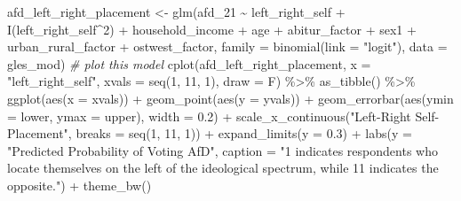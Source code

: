 \documentclass[
]{article}
\newenvironment{Shaded}{\begin{snugshade}}{\end{snugshade}}
\newcommand{\AttributeTok}[1]{\textcolor[rgb]{0.77,0.63,0.00}{#1}}
\newcommand{\CommentTok}[1]{\textcolor[rgb]{0.56,0.35,0.01}{\textit{#1}}}
\newcommand{\DecValTok}[1]{\textcolor[rgb]{0.00,0.00,0.81}{#1}}
\newcommand{\FloatTok}[1]{\textcolor[rgb]{0.00,0.00,0.81}{#1}}
\newcommand{\FunctionTok}[1]{\textcolor[rgb]{0.00,0.00,0.00}{#1}}
\newcommand{\NormalTok}[1]{#1}
\newcommand{\OtherTok}[1]{\textcolor[rgb]{0.56,0.35,0.01}{#1}}
\newcommand{\SpecialCharTok}[1]{\textcolor[rgb]{0.00,0.00,0.00}{#1}}
\newcommand{\StringTok}[1]{\textcolor[rgb]{0.31,0.60,0.02}{#1}}
\begin{document}
\begin{Shaded}
\begin{Highlighting}[]
\NormalTok{afd\_left\_right\_placement }\OtherTok{\textless{}{-}} \FunctionTok{glm}\NormalTok{(afd\_21 }\SpecialCharTok{\textasciitilde{}}\NormalTok{ left\_right\_self }\SpecialCharTok{+} \FunctionTok{I}\NormalTok{(left\_right\_self}\SpecialCharTok{\^{}}\DecValTok{2}\NormalTok{) }\SpecialCharTok{+}\NormalTok{ household\_income }\SpecialCharTok{+}\NormalTok{ age }\SpecialCharTok{+}\NormalTok{ abitur\_factor }\SpecialCharTok{+}\NormalTok{ sex1 }\SpecialCharTok{+}\NormalTok{ urban\_rural\_factor }\SpecialCharTok{+}\NormalTok{ ostwest\_factor, }\AttributeTok{family =} \FunctionTok{binomial}\NormalTok{(}\AttributeTok{link =} \StringTok{"logit"}\NormalTok{), }\AttributeTok{data =}\NormalTok{ gles\_mod)}
\CommentTok{\# plot this model }
\FunctionTok{cplot}\NormalTok{(afd\_left\_right\_placement, }\AttributeTok{x =} \StringTok{"left\_right\_self"}\NormalTok{, }
      \AttributeTok{xvals =} \FunctionTok{seq}\NormalTok{(}\DecValTok{1}\NormalTok{, }\DecValTok{11}\NormalTok{, }\DecValTok{1}\NormalTok{), }\AttributeTok{draw =}\NormalTok{ F) }\SpecialCharTok{\%\textgreater{}\%}
  \FunctionTok{as\_tibble}\NormalTok{() }\SpecialCharTok{\%\textgreater{}\%}
  \FunctionTok{ggplot}\NormalTok{(}\FunctionTok{aes}\NormalTok{(}\AttributeTok{x =}\NormalTok{ xvals)) }\SpecialCharTok{+}
  \FunctionTok{geom\_point}\NormalTok{(}\FunctionTok{aes}\NormalTok{(}\AttributeTok{y =}\NormalTok{ yvals)) }\SpecialCharTok{+}
  \FunctionTok{geom\_errorbar}\NormalTok{(}\FunctionTok{aes}\NormalTok{(}\AttributeTok{ymin =}\NormalTok{ lower, }\AttributeTok{ymax =}\NormalTok{ upper), }\AttributeTok{width =} \FloatTok{0.2}\NormalTok{) }\SpecialCharTok{+}
  \FunctionTok{scale\_x\_continuous}\NormalTok{(}\StringTok{"Left{-}Right Self{-}Placement"}\NormalTok{, }
                     \AttributeTok{breaks =} \FunctionTok{seq}\NormalTok{(}\DecValTok{1}\NormalTok{, }\DecValTok{11}\NormalTok{, }\DecValTok{1}\NormalTok{)) }\SpecialCharTok{+}
  \FunctionTok{expand\_limits}\NormalTok{(}\AttributeTok{y =} \FloatTok{0.3}\NormalTok{) }\SpecialCharTok{+}
  \FunctionTok{labs}\NormalTok{(}\AttributeTok{y =} \StringTok{"Predicted Probability of Voting AfD"}\NormalTok{, }
       \AttributeTok{caption =} \StringTok{"\textquotesingle{}1\textquotesingle{} indicates respondents who locate themselves on the left of the ideological spectrum, while \textquotesingle{}11\textquotesingle{} indicates the opposite."}\NormalTok{) }\SpecialCharTok{+}
  \FunctionTok{theme\_bw}\NormalTok{()}
\end{Highlighting}
\end{Shaded}
\end{document}
